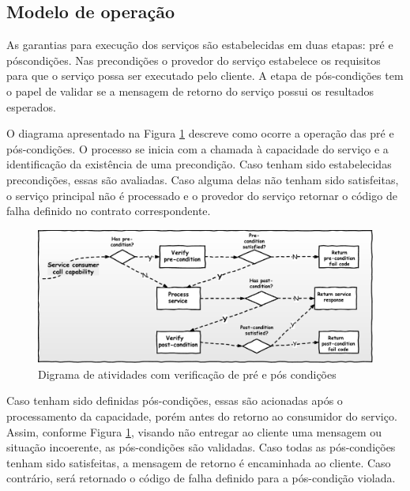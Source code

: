 \vspace{-6mm}

\subsection{Modelo de operação}
\vspace{-6mm}

As garantias para execução dos serviços são estabelecidas em duas etapas: pré e
póscondições. Nas precondições o provedor do serviço estabelece os requisitos
para que o serviço possa ser executado pelo cliente. A etapa de pós-condições
tem o papel de validar se a mensagem de retorno do serviço possui os resultados
esperados.

O diagrama apresentado na Figura \ref{FigServiceDbC} descreve como ocorre a
operação das pré e pós-condições. O processo se inicia com a chamada à capacidade do serviço e a
identificação da existência de uma precondição. Caso tenham sido estabelecidas 
precondições, essas são avaliadas. Caso alguma delas não tenham sido
satisfeitas, o serviço principal não é processado e o provedor do serviço
retornar o código de falha definido no contrato correspondente.


\begin{figure}[!htb]
\centering
\includegraphics[width=140mm,trim = 0mm 0mm 0mm
0mm,clip]{img/FluxoDbcCondicoes.pdf}
\caption{Digrama de atividades com verificação de pré e pós condições}
\label{FigServiceDbC}
\end{figure}

Caso tenham sido definidas pós-condições, essas são acionadas após o
processamento da capacidade, porém antes do retorno ao consumidor do serviço.
Assim, conforme Figura \ref{FigServiceDbC}, visando não entregar ao cliente uma
mensagem ou situação incoerente, as pós-condições são validadas. Caso todas as
pós-condições tenham sido satisfeitas, a mensagem de retorno é encaminhada ao
cliente. Caso contrário, será retornado o código de falha definido para a
pós-condição violada.

